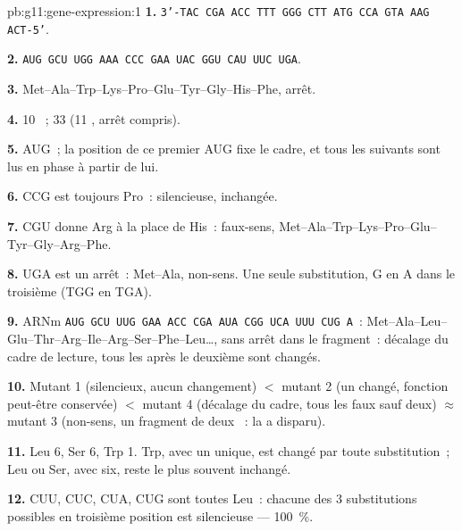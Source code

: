 \begin{solution}{pb:g11:gene-expression:1}
\textbf{1.} \texttt{3'-TAC CGA ACC TTT GGG CTT ATG CCA GTA AAG ACT-5'}.

\textbf{2.} \texttt{AUG GCU UGG AAA CCC GAA UAC GGU CAU UUC UGA}.

\textbf{3.} Met--Ala--Trp--Lys--Pro--Glu--Tyr--Gly--His--Phe, arrêt.

\textbf{4.} 10 ~; 33  (11 , arrêt
compris).

\textbf{5.} AUG~; la position de ce premier AUG fixe le cadre, et tous
les  suivants sont lus en phase à partir de lui.

\textbf{6.} CCG est toujours Pro~: silencieuse,  inchangée.

\textbf{7.} CGU donne Arg à la place de His~: faux-sens,
Met--Ala--Trp--Lys--Pro--Glu--Tyr--Gly--Arg--Phe.

\textbf{8.} UGA est un arrêt~: Met--Ala, non-sens. Une seule
substitution, G en A dans le troisième  (TGG en TGA).

\textbf{9.} ARNm \texttt{AUG GCU UUG GAA ACC CGA AUA CGG UCA UUU CUG
A}~: Met--Ala--Leu--Glu--Thr--Arg--Ile--Arg--Ser--Phe--Leu\dots, sans
arrêt dans le fragment~: décalage du cadre de lecture, tous les  après le deuxième sont changés.

\textbf{10.} Mutant 1 (silencieux, aucun changement) $<$ mutant 2 (un
 changé, fonction peut-être conservée) $<$ mutant 4
(décalage du cadre, tous les  faux sauf deux) $\approx$
mutant 3 (non-sens, un fragment de deux ~: la  a
disparu).

\textbf{11.} Leu 6, Ser 6, Trp 1. Trp, avec un  unique, est changé
par toute substitution~; Leu ou Ser, avec six, reste le plus souvent
inchangé.

\textbf{12.} CUU, CUC, CUA, CUG sont toutes Leu~: chacune des 3
substitutions possibles en troisième position est silencieuse ---
100~\%.


\end{solution}
